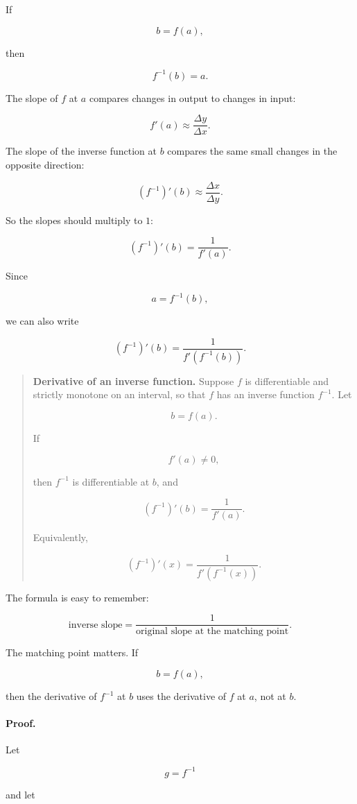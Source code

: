 If

\[
b=f(a),
\]

then

\[
f^{-1}(b)=a.
\]

The slope of \(f\) at \(a\) compares changes in output to changes in input:

\[
f'(a)\approx \frac{\Delta y}{\Delta x}.
\]

The slope of the inverse function at \(b\) compares the same small changes in the opposite direction:

\[
(f^{-1})'(b)\approx \frac{\Delta x}{\Delta y}.
\]

So the slopes should multiply to \(1\):

\[
(f^{-1})'(b)=\frac{1}{f'(a)}.
\]

Since

\[
a=f^{-1}(b),
\]

we can also write

\[
(f^{-1})'(b)=\frac{1}{f'(f^{-1}(b))}.
\]

\begin{quote}
\textbf{Derivative of an inverse function.}
Suppose \(f\) is differentiable and strictly monotone on an interval, so that \(f\) has an inverse function \(f^{-1}\).  Let

\[
b=f(a).
\]

If

\[
f'(a)\neq0,
\]

then \(f^{-1}\) is differentiable at \(b\), and

\[
\boxed{
(f^{-1})'(b)=\frac{1}{f'(a)}.
}
\]

Equivalently,

\[
\boxed{
(f^{-1})'(x)=\frac{1}{f'(f^{-1}(x))}.
}
\]
\end{quote}

The formula is easy to remember:

\[
\text{inverse slope}=\frac{1}{\text{original slope at the matching point}}.
\]

The matching point matters.  If

\[
b=f(a),
\]

then the derivative of \(f^{-1}\) at \(b\) uses the derivative of \(f\) at \(a\), not at \(b\).

\paragraph{Proof.}
Let

\[
g=f^{-1}
\]

and let

